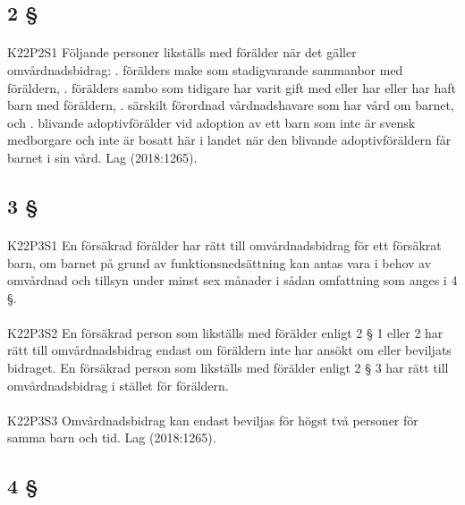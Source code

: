 \documentclass[a4paper,notitlepage,openany,10pt]{book}
\begin{document}
\subsection*{2 §}
\paragraph*{}
{\tiny K22P2S1}
Följande personer likställs med förälder när det gäller omvårdnadsbidrag:
. förälders make som stadigvarande sammanbor med föräldern,
. förälders sambo som tidigare har varit gift med eller har eller har haft barn med föräldern,
. särskilt förordnad vårdnadshavare som har vård om barnet, och
. blivande adoptivförälder vid adoption av ett barn som inte är svensk medborgare och inte är bosatt här i landet när den blivande adoptivföräldern får barnet i sin vård.
Lag (2018:1265).
\subsection*{3 §}
\paragraph*{}
{\tiny K22P3S1}
En försäkrad förälder har rätt till omvårdnadsbidrag för ett försäkrat barn, om barnet på grund av funktionsnedsättning kan antas vara i behov av omvårdnad och tillsyn under minst sex månader i sådan omfattning som anges i 4 §.
\paragraph*{}
{\tiny K22P3S2}
En försäkrad person som likställs med förälder enligt 2 § 1 eller 2 har rätt till omvårdnadsbidrag endast om föräldern inte har ansökt om eller beviljats bidraget. En försäkrad person som likställs med förälder enligt 2 § 3 har rätt till omvårdnadsbidrag i stället för föräldern.
\paragraph*{}
{\tiny K22P3S3}
Omvårdnadsbidrag kan endast beviljas för högst två personer för samma barn och tid.
Lag (2018:1265).
\subsection*{4 §}
\end{document}
